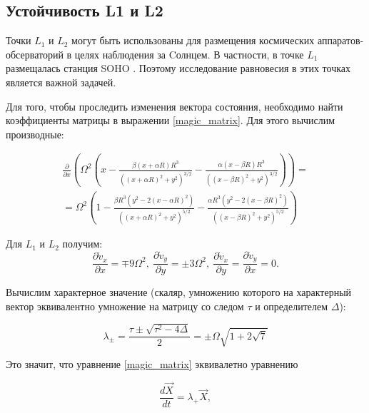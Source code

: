 \documentclass[12pt]{article}
\begin{document}
    \subsection{Устойчивость L1 и L2}
    Точки $L_1$ и $L_2$ могут быть использованы для размещения космических аппаратов-обсерваторий
    в целях наблюдения за Cолнцем. В частности, в точке $L_1$ размещалась станция SOHO \cite{nasagov}.
    Поэтому исследование равновесия в этих точках является важной задачей.
    
    \par Для того, чтобы проследить изменения вектора состояния, необходимо найти 
    коэффициенты матрицы в выражении \ref{magic_matrix}. Для этого вычислим производные:

    \begin{equation}
        \begin{split}
        \frac{\partial}{\partial x}\left(\Omega^2\left(x - \frac{\beta (x + \alpha R)R^3}
            {((x + \alpha R)^2 + y^2)^{3/2}} - 
            \frac{\alpha (x - \beta R)R^3}{((x - \beta R)^2 + y^2)^{3/2}}\right)\right) = \\
        =\Omega^2\left(1 - \frac{\beta R^3(y^2 - 2(x - \alpha R)^2)}{((x + \alpha R)^2 + y^2)^{5/2}} -
        \frac{\alpha R^3(y^2 - 2(x - \beta R)^2)}{((x - \beta R)^2 + y^2)^{5/2}}\right)
        \end{split}
    \end{equation}

    Для $L_1$ и $L_2$ получим:
    \begin{equation}
        \frac{\partial \dot{v}_x}{\partial x} = \mp 9\Omega^2,\ 
        \frac{\partial \dot{v}_y}{\partial y} = \pm 3\Omega^2,\
        \frac{\partial \dot{v}_x}{\partial y} = \frac{\partial \dot{v}_y}{\partial x} = 0.
    \end{equation}

    Вычислим характерное значение (скаляр, умножению которого на характерный вектор
    эквивалентно умножение на матрицу со следом $\tau$ и определителем $\Delta$):
    
    \begin{equation}
        \lambda_{\pm} = \frac{\tau \pm \sqrt{\tau^2 - 4\Delta}}{2} = \pm \Omega\sqrt{1 + 2\sqrt{7}}
    \end{equation}

    Это значит, что уравнение \ref{magic_matrix} эквивалетно уравнению 
    
    \begin{equation}
        \frac{d\vec{X}}{dt} = \lambda_{+}\vec{X},
        \label{exp}
    \end{equation}
\end{document}
